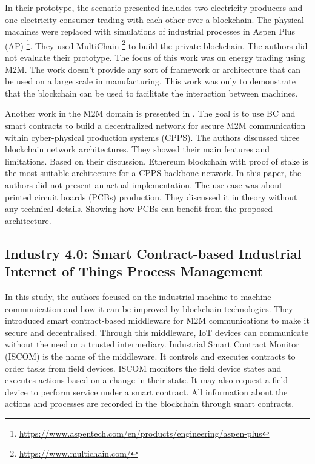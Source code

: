 \documentclass[runningheads]{llncs}
\begin{document}
\noindent In their prototype, the scenario presented includes two electricity producers and one electricity consumer trading with each other over a blockchain. The physical machines were replaced with simulations of industrial processes in Aspen Plus (AP) \footnote{\url{https://www.aspentech.com/en/products/engineering/aspen-plus}}. They used MultiChain \footnote{\url{https://www.multichain.com/}} to build the private blockchain. The authors did not evaluate their prototype. The focus of this work was on energy trading using M2M. The work doesn't provide any sort of framework or architecture that can be used on a large scale in manufacturing. This work was only to demonstrate that the blockchain can be used to facilitate the interaction between machines. \bigbreak 

\noindent Another work in the M2M domain is presented in \cite{Afanasev2018}.  The goal is to use BC and smart contracts to build a decentralized network for secure M2M communication within cyber-physical production systems (CPPS). The authors discussed three blockchain network architectures. They showed their main features and limitations. Based on their discussion, Ethereum blockchain with proof of stake is the most suitable architecture for a CPPS backbone network. In this paper, the authors did not present an actual implementation. The use case was about printed circuit boards (PCBs) production. They discussed it in theory without any technical details.  Showing how PCBs can benefit from the proposed architecture.
 
\subsection{Industry 4.0: Smart Contract-based Industrial Internet of Things Process Management \cite{Garrocho2019}}

In this study, the authors focused on the industrial machine to machine communication and how it can be improved by blockchain technologies. They introduced smart contract-based middleware for M2M communications to make it secure and decentralised. Through this middleware, IoT devices can communicate without the need or a trusted intermediary. Industrial Smart Contract Monitor (ISCOM) is the name of the middleware. It controls and executes contracts to order tasks from field devices. ISCOM monitors the field device states and executes actions based on a change in their state. It may also request a field device to perform service under a smart contract. All information about the actions and processes are recorded in the blockchain through smart contracts. 
\end{document}
